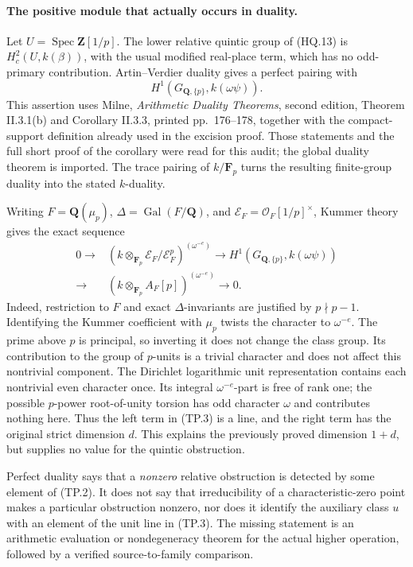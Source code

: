\paragraph{The positive module that actually occurs in duality.}
Let \(U=\operatorname{Spec}\mathbf Z[1/p]\).
The lower relative quintic group of (HQ.13) is
\(H_c^2(U,k(\beta))\), with the usual modified real-place
term, which has no odd-primary contribution.  Artin--Verdier
duality gives a perfect pairing with
\[
 H^1(G_{\mathbf Q,\{p\}},k(\omega\psi)).
 \tag{TP.2}
\]
This assertion uses Milne, \emph{Arithmetic Duality Theorems},
second edition, Theorem II.3.1(b) and Corollary II.3.3,
printed pp.~176--178, together with the compact-support
definition already used in the excision proof.  Those
statements and the full short proof of the corollary were
read for this audit; the global duality theorem is imported.
The trace pairing of \(k/\mathbf F_p\) turns the resulting
finite-group duality into the stated \(k\)-duality.

Writing \(F=\mathbf Q(\mu_p)\), \(\Delta=\operatorname{Gal}(F/\mathbf Q)\),
and \(\mathcal E_F=\mathcal O_F[1/p]^\times\), Kummer
theory gives the exact sequence
\[
\begin{split}
0\longrightarrow&
 (k\otimes_{\mathbf F_p}\mathcal E_F/\mathcal E_F^p)^{(\omega^{-e})}
 \longrightarrow H^1(G_{\mathbf Q,\{p\}},k(\omega\psi))\\
 \longrightarrow&
 (k\otimes_{\mathbf F_p}A_F[p])^{(\omega^{-e})}
 \longrightarrow0.
\end{split}
 \tag{TP.3}
\]
Indeed, restriction to \(F\) and exact \(\Delta\)-invariants
are justified by \(p\nmid p-1\).  Identifying the Kummer
coefficient with \(\mu_p\) twists the character to
\(\omega^{-e}\).  The prime above \(p\) is principal,
so inverting it does not change the class group.
Its contribution to the group of \(p\)-units is a trivial
character and does not affect this nontrivial component.
The Dirichlet logarithmic unit representation contains
each nontrivial even character once.  Its integral
\(\omega^{-e}\)-part is free of rank one; the possible
\(p\)-power root-of-unity torsion has odd character
\(\omega\) and contributes nothing here.
Thus the left term in (TP.3) is a line, and the right
term has the original strict dimension \(d\).
This explains the previously proved dimension \(1+d\),
but supplies no value for the quintic obstruction.

Perfect duality says that a \emph{nonzero} relative
obstruction is detected by some element of (TP.2).
It does not say that irreducibility of a characteristic-zero
point makes a particular obstruction nonzero, nor does it
identify the auxiliary class \(u\) with an element of
the unit line in (TP.3).  The missing statement is an
arithmetic evaluation or nondegeneracy theorem for the
actual higher operation, followed by a verified
source-to-family comparison.


